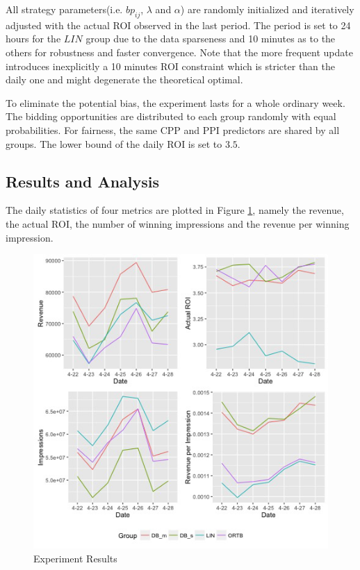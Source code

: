 \documentclass{article}
\newcommand{\sbp}{bp_{ij}}
\begin{document}
All strategy parameters(i.e. $\sbp$, $\lambda$ and $\alpha$) are randomly initialized and
    iteratively adjusted with the actual ROI observed in the last period.
The period is set to 24 hours for the $LIN$ group due to the data sparseness
    and 10 minutes as to the others for robustness and faster convergence.
Note that the more frequent update introduces inexplicitly a 10 minutes ROI constraint
    which is stricter than the daily one and might degenerate the theoretical optimal.

To eliminate the potential bias, the experiment lasts for a whole ordinary week.
The bidding opportunities are distributed to each group randomly with equal probabilities.
For fairness, the same CPP and PPI predictors are shared by all groups.
The lower bound of the daily ROI is set to $3.5$.

\subsection{Results and Analysis}

The daily statistics of four metrics are plotted in Figure \ref{Result},
    namely the revenue, the actual ROI, the number of winning impressions and the revenue per winning impression.

\begin{figure}[!h]
\centering
\includegraphics[width=1.0\linewidth]{./Result.jpg}
\caption{Experiment Results\label{Result}}
\end{figure}
\end{document}

